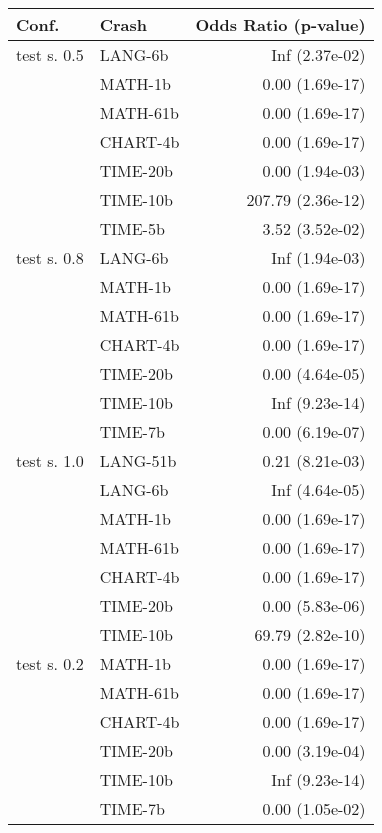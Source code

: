\begin{tabular}{ l | l | r}
\hline 
\textbf{Conf.} & \textbf{Crash} & \textbf{Odds Ratio (p-value)} \\ 
\hline 
test s. 0.5 & LANG-6b & Inf (2.37e-02)\\ 
 & MATH-1b & 0.00 (1.69e-17)\\ 
 & MATH-61b & 0.00 (1.69e-17)\\ 
 & CHART-4b & 0.00 (1.69e-17)\\ 
 & TIME-20b & 0.00 (1.94e-03)\\ 
 & TIME-10b & 207.79 (2.36e-12)\\ 
 & TIME-5b & 3.52 (3.52e-02)\\ 
\hline 
test s. 0.8 & LANG-6b & Inf (1.94e-03)\\ 
 & MATH-1b & 0.00 (1.69e-17)\\ 
 & MATH-61b & 0.00 (1.69e-17)\\ 
 & CHART-4b & 0.00 (1.69e-17)\\ 
 & TIME-20b & 0.00 (4.64e-05)\\ 
 & TIME-10b & Inf (9.23e-14)\\ 
 & TIME-7b & 0.00 (6.19e-07)\\ 
\hline 
test s. 1.0 & LANG-51b & 0.21 (8.21e-03)\\ 
 & LANG-6b & Inf (4.64e-05)\\ 
 & MATH-1b & 0.00 (1.69e-17)\\ 
 & MATH-61b & 0.00 (1.69e-17)\\ 
 & CHART-4b & 0.00 (1.69e-17)\\ 
 & TIME-20b & 0.00 (5.83e-06)\\ 
 & TIME-10b & 69.79 (2.82e-10)\\ 
\hline 
test s. 0.2 & MATH-1b & 0.00 (1.69e-17)\\ 
 & MATH-61b & 0.00 (1.69e-17)\\ 
 & CHART-4b & 0.00 (1.69e-17)\\ 
 & TIME-20b & 0.00 (3.19e-04)\\ 
 & TIME-10b & Inf (9.23e-14)\\ 
 & TIME-7b & 0.00 (1.05e-02)\\ 
\hline 
\end{tabular}